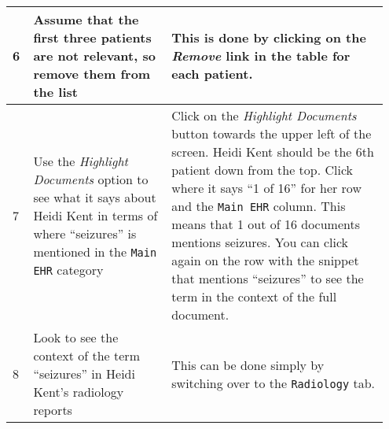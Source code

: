 \begin{center}
\begin{longtable}{|p{0.05\linewidth}|p{0.35\linewidth}|p{0.55\linewidth}|}
    \hline
    6 & Assume that the first three patients are not relevant, so remove them from the list & This is done by clicking on the \textit{Remove} link in the table for each patient. \\
    \hline
    7 & Use the \textit{Highlight Documents} option to see what it says about Heidi Kent in terms of where “seizures” is mentioned in the \texttt{Main EHR} category & Click on the \textit{Highlight Documents} button towards the upper left of the screen.  Heidi Kent should be the 6th patient down from the top. Click where it says “1 of 16” for her row and the \texttt{Main EHR} column. This means that 1 out of 16 documents mentions seizures. You can click again on the row with the snippet that mentions “seizures” to see the term in the context of the full document. \\
    \hline
    8 & Look to see the context of the term “seizures” in Heidi Kent’s radiology reports & This can be done simply by switching over to the \texttt{Radiology} tab. \\
    \hline
    \end{longtable}
    \label{tab:scenario_1}
\end{center}

